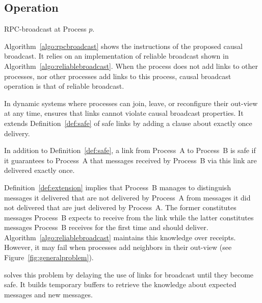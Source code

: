 \subsection{Operation}


\begin{algorithm}[h]
  
  \caption{\label{algo:rpcbroadcast}RPC-broadcast at Process $p$.}
\end{algorithm}


Algorithm~\ref{algo:rpcbroadcast} shows the instructions of the proposed causal
broadcast. It relies on an implementation of reliable broadcast shown in
Algorithm~\ref{algo:reliablebroadcast}. When the process does not add links to
other processes, nor other processes add links to this process, causal broadcast
operation is that of reliable broadcast. 

In dynamic systems where processes can join, leave, or reconfigure their
out-view at any time, \RPCBROADCAST ensures that links cannot violate causal
broadcast properties. It extends Definition~\ref{def:safe} of safe links by
adding a clause about exactly once delivery. 


\begin{definition}
  In addition to Definition~\ref{def:safe}, a link from Process~A to Process~B
  is safe if it guarantees to Process~A that messages received by Process~B via
  this link are delivered exactly once.
\end{definition}

Definition~\ref{def:extension} implies that Process~B manages to distinguish
messages it delivered that are not delivered by Process~A from messages it did
not delivered that are just delivered by Process~A. The former constitutes
messages Process~B expects to receive from the link while the latter constitutes
messages Process~B receives for the first time and should
deliver. Algorithm~\ref{algo:reliablebroadcast} maintains this knowledge over
receipts. However, it may fail when processes add neighbors in their out-view
(see Figure~\ref{fig:generalproblem}).

\RPCBROADCAST solves this problem by delaying the use of links for broadcast
until they become safe. It builds temporary buffers to retrieve the knowledge
about expected messages and new messages.

